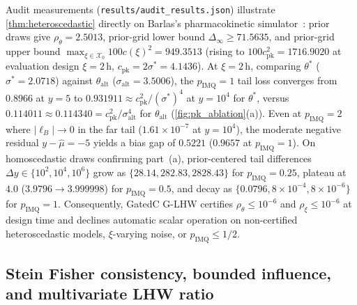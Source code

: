 \documentclass[11pt,a4paper,reqno]{amsart}
\theoremstyle{definition}
\theoremstyle{remark}
\newcommand{\Xcal}{\mathcal{X}}
\begin{document}
Audit measurements (\texttt{results/audit\_results.json}) illustrate \cref{thm:heteroscedastic} directly on Barlas's pharmacokinetic simulator~\cite{barlas2025gboed}: prior draws give $\rho_\theta = 2.5013$, prior-grid lower bound $\Delta_\infty \ge 71.5635$, and prior-grid upper bound $\max_{\xi \in \Xcal_0} 100 c(\xi)^2 = 949.3513$ (rising to $100 c_{\mathrm{pk}}^2 = 1716.9020$ at evaluation design $\xi = 2\,\mathrm{h}$, $c_{\mathrm{pk}} = 2\sigma^* = 4.1436$). At $\xi = 2\,\mathrm{h}$, comparing $\theta^*$ ($\sigma^* = 2.0718$) against $\theta_{\mathrm{alt}}$ ($\sigma_{\mathrm{alt}} = 3.5006$), the $p_{\mathrm{IMQ}} = 1$ tail loss converges from $0.8966$ at $y=5$ to $0.931911 \approx c_{\mathrm{pk}}^2/(\sigma^*)^4$ at $y=10^4$ for $\theta^*$, versus $0.114011 \approx 0.114340 = c_{\mathrm{pk}}^2/\sigma_{\mathrm{alt}}^4$ for $\theta_{\mathrm{alt}}$ (\cref{fig:pk_ablation}(a)). Even at $p_{\mathrm{IMQ}} = 2$ where $|\ell_B| \to 0$ in the far tail ($1.61 \times 10^{-7}$ at $y=10^4$), the moderate negative residual $y - \hat{\mu} = -5$ yields a bias gap of $0.5221$ ($0.9657$ at $p_{\mathrm{IMQ}} = 1$). On homoscedastic draws confirming part~(a), prior-centered tail differences $\Delta y \in \{10^2, 10^4, 10^6\}$ grow as $\{28.14, 282.83, 2828.43\}$ for $p_{\mathrm{IMQ}} = 0.25$, plateau at $4.0$ ($3.9796 \to 3.999998$) for $p_{\mathrm{IMQ}} = 0.5$, and decay as $\{0.0796, 8\times 10^{-4}, 8\times 10^{-6}\}$ for $p_{\mathrm{IMQ}} = 1$. Consequently, GatedC G-LHW certifies $\rho_\theta \le 10^{-6}$ and $\rho_\xi \le 10^{-6}$ at design time and declines automatic scalar operation on non-certified heteroscedastic models, $\xi$-varying noise, or $p_{\mathrm{IMQ}} \le 1/2$.

\subsection{Stein Fisher consistency, bounded influence, and multivariate LHW ratio}
\end{document}
